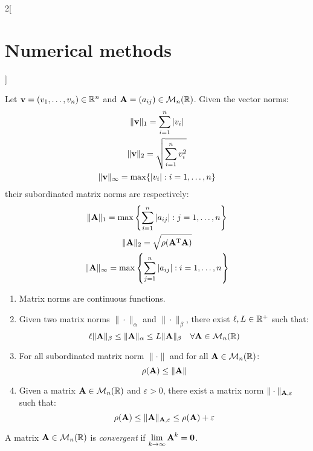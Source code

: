 \documentclass[../../../main.tex]{subfiles}
\begin{document}
\begin{multicols}{2}[\section{Numerical methods}]
\begin{definition}
\end{definition}
\begin{prop}
    Let $\vb{v}=(v_1,\ldots,v_n)\in\mathbb{R}^n$ and $\vb{A}=(a_{ij})\in\mathcal{M}_n(\mathbb{R})$. Given the vector norms: 
    \begin{gather*}
        \|\vb{v}\|_1=\sum_{i=1}^n|v_i|\\
        \|\vb{v}\|_2=\sqrt{\sum_{i=1}^nv_i^2}\\
        \|\vb{v}\|_\infty=\max\{|v_i|:i=1,\ldots,n\}
    \end{gather*}
    their subordinated matrix norms are respectively:
    \begin{gather*}
        \|\vb{A}\|_1=\max\left\{\sum_{i=1}^n|a_{ij}|:j=1,\ldots,n\right\}\\
        \|\vb{A}\|_2=\sqrt{\rho(\vb{A}^{\mathrm{T}}\vb{A})}\\
        \|\vb{A}\|_\infty=\max\left\{\sum_{j=1}^n|a_{ij}|:i=1,\ldots,n\right\}
    \end{gather*}
\end{prop}
\begin{prop}
    \hfill
    \begin{enumerate}
        \item Matrix norms are continuous functions.
        \item Given two matrix norms $\|\cdot\|_\alpha$ and $\|\cdot\|_\beta$, there exist $\ell, L\in\mathbb{R}^+$ such that: $$\ell \|\vb{A}\|_\beta\leq\|\vb{A}\|_\alpha\leq L\|\vb{A}\|_\beta\quad\forall\vb{A}\in\mathcal{M}_n(\mathbb{R})$$
        \item For all subordinated matrix norm $\|\cdot\|$ and for all $\vb{A}\in\mathcal{M}_n(\mathbb{R})$: $$\rho(\vb{A})\leq\|\vb{A}\|$$
        \item Given a matrix $\vb{A}\in\mathcal{M}_n(\mathbb{R})$ and $\varepsilon>0$, there exist a matrix norm $\|\cdot\|_{\vb{A},\varepsilon}$ such that: $$\rho(\vb{A})\leq\|\vb{A}\|_{\vb{A},\varepsilon}\leq\rho(\vb{A})+\varepsilon$$
    \end{enumerate}
\end{prop}
\begin{definition}
    A matrix $\vb{A}\in\mathcal{M}_n(\mathbb{R})$ is \textit{convergent} if $\displaystyle\lim_{k\to\infty}\vb{A}^k=\vb{0}$.  
\end{definition}
\begin{theorem}

\end{theorem}
\end{multicols}
\end{document}
